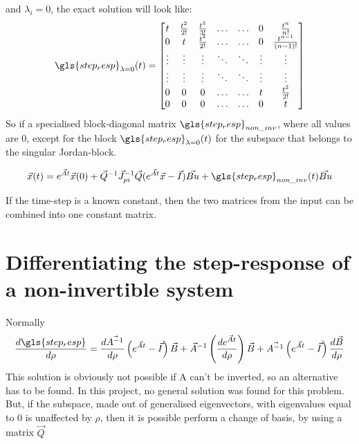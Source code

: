 and $\lambda_i =0$, the exact solution will look like: \\

\begin{equation}
    \gls{step_resp}_{\lambda=0}(t) = 
\begin{bmatrix}{}

t & \frac{t^2}{2!} & \frac{t^3}{3!} &\dots &\dots & 0 & \frac{t^n}{n!} \\
 0 & t & \frac{t^2}{2!} & \dots &\dots & 0 & \frac{t^{n-1}}{(n-1)!} \\
 
 \vdots & \vdots & \vdots & \ddots & \ddots & \vdots & \vdots\\
 
 \vdots & \vdots & \vdots & \ddots & \ddots & \vdots & \vdots\\
 
 0 & 0 & 0 & \dots & \dots & t & \frac{t^2}{2!} \\
 
 0 & 0 & 0 & \dots & \dots & 0 & t \\
\end{bmatrix}
\end{equation}{}
So if a specialised block-diagonal matrix $\gls{step_resp}_{non\_inv}$, where all values are 0, except for the block $\gls{step_resp}_{\lambda=0}(t)$ for the subspace that belongs to the singular Jordan-block. 


\begin{equation}
    \Vec{x}(t) = e^{\Vec{A}t}\Vec{x}(0) + \Vec{Q}^{-1}\Vec{J}^{-1}_{pi}\Vec{Q}(e^{\Vec{A}t}\Vec{x} - \Vec{I})\Vec{Bu} + \gls{step_resp}_{non\_inv}(t) \Vec{Bu}
\end{equation}{}

If the time-step is a known constant, then the two matrices from the input can be combined into one constant matrix. 



\section{Differentiating the step-response of a non-invertible system}
\label{sec:differentiating_step_response_from_input}
Normally
\begin{equation}
    \frac{d \gls{step_resp}}{d \rho} = \frac{d\Vec{A^{-1}}}{d \rho} \left( e^{\Vec{A}t} - \Vec{I}\right)\Vec{B} + \Vec{A}^{-1} \left( \frac{de^{\Vec{A}t}}{d\rho}\right)\Vec{B} +  \Vec{A^{-1}} \left( e^{\Vec{A}t} - \Vec{I}\right)\frac{d\Vec{B}}{d\rho}
\end{equation}
This solution is obviously not possible if A can't be inverted, so an alternative has to be found. In this project, no general solution was found for this problem. But, if the subspace, made out of generalised eigenvectors, with eigenvalues equal to 0 is unaffected by $\rho$, then it is possible perform a change of basis, by using a matrix $\Vec{Q}$

